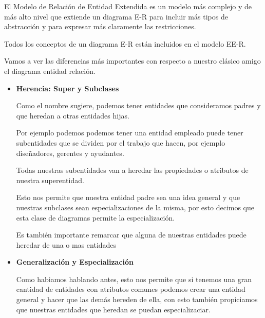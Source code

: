 \documentclass[12pt, fleqn]{report}                             %
\begin{document}
            El Modelo de Relación de Entidad Extendida es un modelo más complejo y de más
            alto nivel que extiende un diagrama E-R para incluir más tipos de abstracción
            y para expresar más claramente las restricciones.

            Todos los conceptos de un diagrama E-R están incluidos en el modelo EE-R.

            Vamos a ver las diferencias más importantes con respecto a nuestro clásico
            amigo el diagrama entidad relación.

        \begin{itemize}
            \item
                \textbf{Herencia: Super y Subclases}

                Como el nombre sugiere, podemos tener entidades que consideramos padres
                y que heredan a otras entidades hijas.

                Por ejemplo podemos podemos tener una entidad empleado puede tener
                subentidades que se dividen por el trabajo que hacen, por ejemplo
                diseñadores, gerentes y ayudantes.

                Todas nuestras subentidades van a heredar las propiedades o atributos
                de nuestra superentidad.

                Esto nos permite que nuestra entidad padre sea una idea general y que
                nuestras subclases sean especializaciones de la misma, por esto decimos
                que esta clase de diagramas permite la especialización.


                Es también importante remarcar que alguna de nuestras entidades
                puede heredar de una o mas entidades


            \item
                \textbf{Generalización y Especialización}

                Como habiamos hablando antes, esto nos permite que si tenemos
                una gran cantidad de entidades con atributos comunes podemos 
                crear una entidad general y hacer que las demás hereden de ella,
                con esto también propiciamos que nuestras entidades que heredan 
                se puedan especializaciar.


            \clearpage


\end{itemize}
\end{document}
